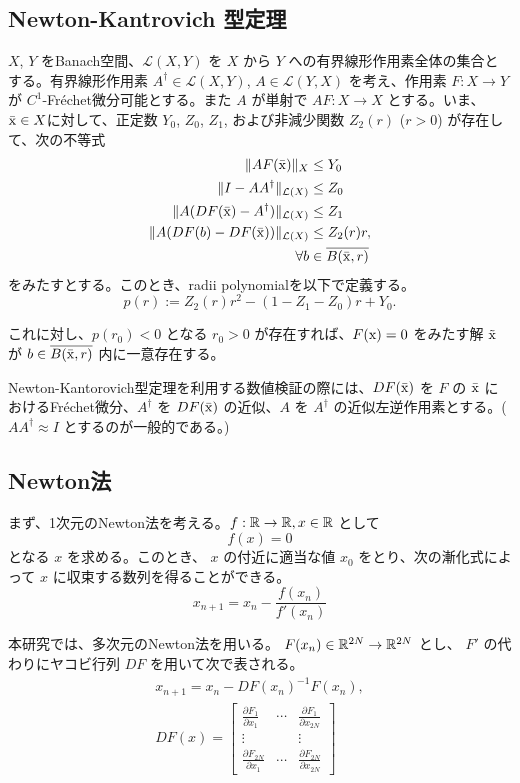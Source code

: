\subsection{Newton-Kantrovich 型定理}
\begin{thm}
$X$, $Y$ をBanach空間、$\mathcal{L}(X,Y)$ を $X$ から $Y$ への有界線形作用素全体の集合とする。有界線形作用素 $A^\dagger \in \mathcal{L}(X,Y)$, $A \in \mathcal{L} (Y,X)$ を考え、作用素 $F: X \rightarrow Y$ が $C^1$-Fréchet微分可能とする。また $A$ が単射で $AF: X \rightarrow X$ とする。いま、$\bar {\mathrm x} \in X$に対して、正定数 $Y_0$, $Z_0$, $Z_1$, および非減少関数 $Z_2(r)$ ($r>0$) が存在して、次の不等式
    \begin{align*}
    \|AF(\bar {\mathrm x})\|_X &\leq Y_0 \\
    \|I - A A^\dagger\|_{\mathcal{L}(X)} &\leq Z_0 \\
    \|A (DF(\bar {\mathrm x}) - A^\dagger)\|_{\mathcal{L}(X)}&\leq Z_1 \\
    \|A (DF(b) - DF(\bar {\mathrm x}))\|_{\mathcal{L}(X)} &\leq Z_2 (r)r, \\
    \forall b &\in \overline{B(\bar {\mathrm x}, r)}
    \end{align*}
をみたすとする。このとき、radii polynomialを以下で定義する。
$$
    p(r) := Z_2 (r)r^2 - (1 - Z_1 - Z_0)r + Y_0.
$$

これに対し、$p(r_0)<0$ となる $r_0 > 0$ が存在すれば、$F(\mathrm x) = 0$ をみたす解 $\tilde {\mathrm x}$ が $b \in \overline{B(\bar {\mathrm x}, r)}$ 内に一意存在する。
\end{thm}

Newton-Kantorovich型定理を利用する数値検証の際には、$DF(\bar {\mathrm x})$ を $F$ の $\bar {\mathrm x}$ におけるFréchet微分、$A^\dagger$ を $DF(\bar {\mathrm x})$ の近似、$A$ を $A^\dagger$ の近似左逆作用素とする。($AA^\dagger \approx I$ とするのが一般的である。)

\subsection{Newton法}
まず、1次元のNewton法を考える。$f: \mathbb{R} \to \mathbb{R}, x \in \mathbb{R}$ として
$$
f(x) = 0
$$
となる $x$ を求める。このとき、 $x$ の付近に適当な値 $x_0$ をとり、次の漸化式によって $x$ に収束する数列を得ることができる。
$$
x_{n+1} = x_n - \frac{f(x_n)}{f'(x_n)}
$$

本研究では、多次元のNewton法を用いる。 $F(x_n) \in \mathbb{R}^{2N} \to \mathbb{R}^{2N}$ とし、 $F'$ の代わりにヤコビ行列 $DF$ を用いて次で表される。
\begin{align*}
x_{n+1} = x_n - DF(x_n)^{-1}F(x_n), \\
DF(x) = 
\begin{bmatrix}
\frac{\partial F_1}{\partial x_1} & \cdots & \frac{\partial F_1}{\partial x_{2N}} \\
\vdots & & \vdots \\
\frac{\partial F_{2N}}{\partial x_1}  & \cdots & \frac{\partial F_{2N}}{\partial x_{2N}} 
\end{bmatrix}
\end{align*}

